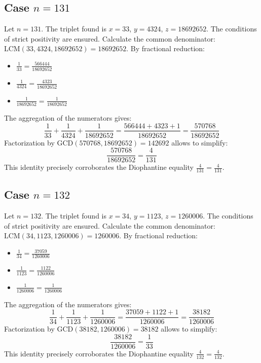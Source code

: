 \documentclass[11pt,a4paper]{article}
\begin{document}
\subsection{Case $n = 131$}
Let $n = 131$. The triplet found is $x = 33$, $y = 4324$, $z = 18692652$.
The conditions of strict positivity are ensured.
Calculate the common denominator: $\text{LCM}(33, 4324, 18692652) = 18692652$.
By fractional reduction:
\begin{itemize}
    \item $\frac{1}{33} = \frac{566444}{18692652}$
    \item $\frac{1}{4324} = \frac{4323}{18692652}$
    \item $\frac{1}{18692652} = \frac{1}{18692652}$
\end{itemize}
The aggregation of the numerators gives:
$$ \frac{1}{33} + \frac{1}{4324} + \frac{1}{18692652} = \frac{566444 + 4323 + 1}{18692652} = \frac{570768}{18692652} $$
Factorization by $\text{GCD}(570768, 18692652) = 142692$ allows to simplify:
$$ \frac{570768}{18692652} = \frac{4}{131} $$
This identity precisely corroborates the Diophantine equality $\frac{4}{131} = \frac{4}{131}$.

\subsection{Case $n = 132$}
Let $n = 132$. The triplet found is $x = 34$, $y = 1123$, $z = 1260006$.
The conditions of strict positivity are ensured.
Calculate the common denominator: $\text{LCM}(34, 1123, 1260006) = 1260006$.
By fractional reduction:
\begin{itemize}
    \item $\frac{1}{34} = \frac{37059}{1260006}$
    \item $\frac{1}{1123} = \frac{1122}{1260006}$
    \item $\frac{1}{1260006} = \frac{1}{1260006}$
\end{itemize}
The aggregation of the numerators gives:
$$ \frac{1}{34} + \frac{1}{1123} + \frac{1}{1260006} = \frac{37059 + 1122 + 1}{1260006} = \frac{38182}{1260006} $$
Factorization by $\text{GCD}(38182, 1260006) = 38182$ allows to simplify:
$$ \frac{38182}{1260006} = \frac{1}{33} $$
This identity precisely corroborates the Diophantine equality $\frac{4}{132} = \frac{4}{132}$.
\end{document}
